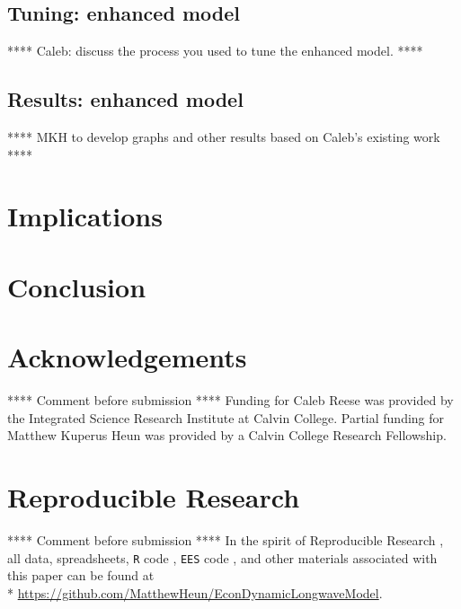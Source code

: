 \documentclass[letterpaper,12pt]{article}
\begin{document}
\subsection{Tuning: enhanced model}
\label{sec:Tuning_enhanced_model}

**** Caleb: discuss the process you used to tune the enhanced model. ****

\subsection{Results: enhanced model}
\label{sec:Results_enhanced_model}

**** MKH to develop graphs and other results based on Caleb's existing work ****


\section{Implications}
\label{sec:Implications}


\section{Conclusion}
\label{sec:Conclustion}


\section*{Acknowledgements}
\label{sec:Acknowledgements}

**** Comment before submission **** Funding for Caleb Reese was provided by the Integrated Science Research Institute at Calvin College. Partial funding for Matthew Kuperus Heun was provided by a Calvin College Research Fellowship. 

\section*{Reproducible Research}

**** Comment before submission **** In the spirit of Reproducible Research \citep{Gandrud:2013vx}, all data, spreadsheets, \texttt{R} code \citep{R}, \texttt{EES} code \citep{EES}, and other materials associated with this paper can be found at\\*
\protect\url{https://github.com/MatthewHeun/EconDynamicLongwaveModel}.





\end{document}
